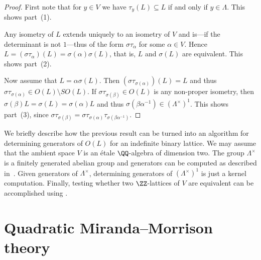 \begin{proof}
  First note that for $y \in V$ we have $\tau_y(L) \subseteq L$ if and only if $y \in \Lambda$.
  This shows part~(1).

  Any isometry of $L$ extends uniquely to an isometry of $V$ and is---if the determinant is not $1$---thus of the form $\sigma \tau_\alpha$ for some $\alpha \in V$.
  Hence $L = (\sigma \tau_\alpha)(L) = \sigma(\alpha) \sigma(L)$, that is, $L$ and $\sigma(L)$ are equivalent.
  This shows part~(2).

  Now assume that $L = \alpha \sigma(L)$.
  Then $(\sigma \tau_{\sigma(\alpha)})(L) = L$ and thus $\sigma \tau_{\sigma(\alpha)} \in O(L) \setminus SO(L)$.
  If $\sigma \tau_{\sigma(\beta)} \in O(L)$ is any non-proper isometry, then $\sigma(\beta) L = \sigma(L) = \sigma(\alpha) L$ and thus $\sigma(\beta \alpha^{-1}) \in (\Lambda^\times)^1$.
  This shows part~(3), since $\sigma \tau_{\sigma(\beta)} = \sigma \tau_{\sigma(\alpha)}\tau_{\sigma(\beta \alpha^{-1})}$.
\end{proof}
%
\begin{remark}
  We briefly describe how the previous result can be turned into an algorithm for determining generators of $O(L)$ for an indefinite binary lattice.
  We may assume that the ambient space $V$ is an étale $\QQ$-algebra of dimension two.
  The group $\Lambda^\times$ is a finitely generated abelian group and generators
  can be computed as described in~\cite{Bley2005, Kluners2005}.
  Given generators of $\Lambda^\times$, determining generators of $(\Lambda^\times)^1$ is just a kernel computation.
  Finally, testing whether two $\ZZ$-lattices of $V$ are equivalent can be accomplished using \cite{Bley2005, Marseglia2020}.
\end{remark}


\section{Quadratic Miranda--Morrison theory} \label{mmtheory}

